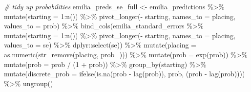 \documentclass[
]{book}
\newenvironment{Shaded}{\begin{snugshade}}{\end{snugshade}}
\newcommand{\AttributeTok}[1]{\textcolor[rgb]{0.77,0.63,0.00}{#1}}
\newcommand{\CommentTok}[1]{\textcolor[rgb]{0.56,0.35,0.01}{\textit{#1}}}
\newcommand{\DecValTok}[1]{\textcolor[rgb]{0.00,0.00,0.81}{#1}}
\newcommand{\FunctionTok}[1]{\textcolor[rgb]{0.00,0.00,0.00}{#1}}
\newcommand{\NormalTok}[1]{#1}
\newcommand{\OtherTok}[1]{\textcolor[rgb]{0.56,0.35,0.01}{#1}}
\newcommand{\SpecialCharTok}[1]{\textcolor[rgb]{0.00,0.00,0.00}{#1}}
\newcommand{\StringTok}[1]{\textcolor[rgb]{0.31,0.60,0.02}{#1}}
\begin{document}
\begin{Shaded}
\begin{Highlighting}[]
\CommentTok{\# tidy up probabilities}
\NormalTok{emilia\_preds\_se\_full }\OtherTok{\textless{}{-}}\NormalTok{ emilia\_predictions }\SpecialCharTok{\%\textgreater{}\%}
  \FunctionTok{mutate}\NormalTok{(}\AttributeTok{starting =} \DecValTok{1}\SpecialCharTok{:}\FunctionTok{n}\NormalTok{()) }\SpecialCharTok{\%\textgreater{}\%}
  \FunctionTok{pivot\_longer}\NormalTok{(}\SpecialCharTok{{-}}\NormalTok{ starting, }\AttributeTok{names\_to =} \StringTok{\textquotesingle{}placing\textquotesingle{}}\NormalTok{, }\AttributeTok{values\_to =} \StringTok{\textquotesingle{}prob\textquotesingle{}}\NormalTok{) }\SpecialCharTok{\%\textgreater{}\%} 
  \FunctionTok{bind\_cols}\NormalTok{(emilia\_standard\_errors }\SpecialCharTok{\%\textgreater{}\%} \FunctionTok{mutate}\NormalTok{(}\AttributeTok{starting =} \DecValTok{1}\SpecialCharTok{:}\FunctionTok{n}\NormalTok{()) }\SpecialCharTok{\%\textgreater{}\%}
  \FunctionTok{pivot\_longer}\NormalTok{(}\SpecialCharTok{{-}}\NormalTok{ starting, }\AttributeTok{names\_to =} \StringTok{\textquotesingle{}placing\textquotesingle{}}\NormalTok{, }\AttributeTok{values\_to =} \StringTok{\textquotesingle{}se\textquotesingle{}}\NormalTok{) }\SpecialCharTok{\%\textgreater{}\%}
\NormalTok{    dplyr}\SpecialCharTok{::}\FunctionTok{select}\NormalTok{(se)) }\SpecialCharTok{\%\textgreater{}\%}
  \FunctionTok{mutate}\NormalTok{(}\AttributeTok{placing =} \FunctionTok{as.numeric}\NormalTok{(}\FunctionTok{str\_remove}\NormalTok{(placing, }\StringTok{\textquotesingle{}prob\_\textquotesingle{}}\NormalTok{))) }\SpecialCharTok{\%\textgreater{}\%}
  \FunctionTok{mutate}\NormalTok{(}\AttributeTok{prob =} \FunctionTok{exp}\NormalTok{(prob)) }\SpecialCharTok{\%\textgreater{}\%}
  \FunctionTok{mutate}\NormalTok{(}\AttributeTok{prob =}\NormalTok{ prob }\SpecialCharTok{/}\NormalTok{ (}\DecValTok{1} \SpecialCharTok{+}\NormalTok{ prob)) }\SpecialCharTok{\%\textgreater{}\%}
  \FunctionTok{group\_by}\NormalTok{(starting) }\SpecialCharTok{\%\textgreater{}\%} 
  \FunctionTok{mutate}\NormalTok{(}\AttributeTok{discrete\_prob =} \FunctionTok{ifelse}\NormalTok{(}\FunctionTok{is.na}\NormalTok{(prob }\SpecialCharTok{{-}} \FunctionTok{lag}\NormalTok{(prob)), prob, (prob }\SpecialCharTok{{-}} \FunctionTok{lag}\NormalTok{(prob)))) }\SpecialCharTok{\%\textgreater{}\%}
  \FunctionTok{ungroup}\NormalTok{()}


\end{Highlighting}
\end{Shaded}
\end{document}
